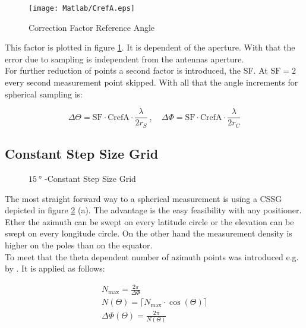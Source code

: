 \begin{figure}
\centering
\texttt{[image: Matlab/CrefA.eps]}
\caption{Correction Factor Reference Angle}
\label{fig:crefa}
\end{figure}

This factor is plotted in figure \ref{fig:crefa}. It is dependent of the aperture. With that the error due to sampling is independent from the antennas aperture.\\
For further reduction of points a second factor is introduced, the \acf{SF}. At $\text{SF}=2$ every second measurement point skipped. With all that the angle increments for spherical sampling is:

\begin{equation}
\Delta\Theta = \text{SF}\cdot\text{CrefA}\cdot\frac{\lambda}{2r_S}\ ,\quad\Delta\Phi = \text{SF}\cdot\text{CrefA}\cdot\frac{\lambda}{2r_C}
\label{eq:angle}
\end{equation}

\subsection{Constant Step Size Grid}


\begin{figure}[h]
  \centering
  \centering
\caption{$\SI{15}{\degree}$ -Constant Step Size Grid}
\label{fig:cssg}
\end{figure}

The most straight forward way to a spherical measurement is using a \ac{CSSG} depicted in figure \ref{fig:cssg} (a). The advantage is the easy feasibility with any positioner. Ether the azimuth can be swept on every latitude circle or the elevation can be swept on every longitude circle. On the other hand the measurement density is higher on the poles than on the equator.\\
To meet that the theta dependent number of azimuth points was introduced e.g. by \cite{ctiaat}. It is applied as follows:

\begin{align}
N_{\text{max}} = \frac{2\pi}{\Delta\Phi}\\
N\left(\Theta\right)=\lceil N_{\text{max}}\cdot\cos\left(\Theta\right)\rceil\\
\Delta\Phi\left(\Theta\right) = \frac{2\pi}{N\left(\Theta\right)}
\end{align}

